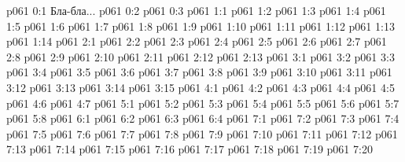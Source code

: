 \author{Носитель Жизни}
\vs p061 0:1  Бла-бла...
\vs p061 0:2 
\vs p061 0:3 
\vs p061 1:1 
\vs p061 1:2 
\vs p061 1:3 
\vs p061 1:4 
\vs p061 1:5 
\vs p061 1:6 
\vs p061 1:7 
\vs p061 1:8 
\vs p061 1:9 \pc 
\vs p061 1:10 
\vs p061 1:11 \pc 
\vs p061 1:12 
\vs p061 1:13 
\vs p061 1:14 \pc 
{}
\vs p061 2:1 
\vs p061 2:2 
\vs p061 2:3 \pc 
\vs p061 2:4 
\vs p061 2:5 
\vs p061 2:6 
\vs p061 2:7 
\vs p061 2:8 \pc 
\vs p061 2:9 
\vs p061 2:10 
\vs p061 2:11 
\vs p061 2:12 
\vs p061 2:13 \pc 
{}
\vs p061 3:1 
\vs p061 3:2 
\vs p061 3:3 \pc 
\vs p061 3:4 \pc 
\vs p061 3:5 
\vs p061 3:6 
\vs p061 3:7 \pc 
\vs p061 3:8 
\vs p061 3:9 
\vs p061 3:10 
\vs p061 3:11 \pc 
\vs p061 3:12 \pc 
\vs p061 3:13 
\vs p061 3:14 
\vs p061 3:15 \pc 
{}
\vs p061 4:1 
\vs p061 4:2 \pc 
\vs p061 4:3 
\vs p061 4:4 
\vs p061 4:5 \pc 
\vs p061 4:6 
\vs p061 4:7 \pc 
{}
\vs p061 5:1 
\vs p061 5:2 
\vs p061 5:3 
\vs p061 5:4 
\vs p061 5:5 \pc 
\vs p061 5:6 \pc 
\vs p061 5:7 
\vs p061 5:8 
\vs p061 6:1 
\vs p061 6:2 \pc 
\vs p061 6:3 
\vs p061 6:4 \pc 
{}
\vs p061 7:1 
\vs p061 7:2 \pc 
\vs p061 7:3 
\vs p061 7:4 \pc 
\vs p061 7:5 
\vs p061 7:6 \pc 
\vs p061 7:7 
\vs p061 7:8 \pc 
\vs p061 7:9 \pc 
\vs p061 7:10 
\vs p061 7:11 \pc 
\vs p061 7:12 
\vs p061 7:13 
\vs p061 7:14 
\vs p061 7:15 
\vs p061 7:16 
\vs p061 7:17 \pc 
\vs p061 7:18 \pc 
\vs p061 7:19 \pc 
\vsetoff
\vs p061 7:20 
\quizlink
